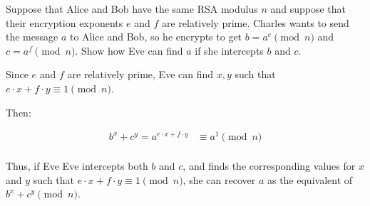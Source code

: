 \begin{problem}
Suppose that Alice and Bob have the same RSA modulus $n$ and suppose that their encryption exponents $e$ and $f$ are relatively prime.  Charles wants to send the message $a$ to Alice and Bob, so he encrypts to get $b=a^e \pmod{n}$ and $c=a^f \pmod{n}$.  Show how Eve can find $a$ if she intercepts $b$ and $c$.
\end{problem}

\begin{Answer}
  Since $e$ and $f$ are relatively prime,
  Eve can find $x, y$ such that $e \cdot x + f \cdot y \equiv 1 \pmod n$.

  \noindent
  Then:

  \begin{align*}
    b^x + c^y = a^{e \cdot x + f \cdot y} &\equiv a^{1} \pmod{n} \\
  \end{align*}

  \noindent
  Thus, if Eve Eve intercepts both $b$ and $c$,
  and finds the corresponding values for $x$ and $y$ such that $e \cdot x + f \cdot y \equiv 1 \pmod n$,
  she can recover $a$ as the equivalent of $b^x + c^y \pmod{n}$.
\end{Answer}
